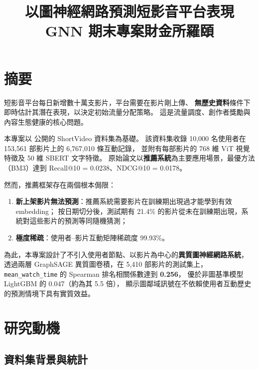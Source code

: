 \documentclass[12pt, a4paper]{article}
\title{%
  \vspace{-1.8cm}
  {\LARGE\bfseries 以圖神經網路預測短影音平台表現}\\[0em]
  {\normalsize GNN 期末專案\quad\textperiodcentered\quad 財金所\;羅頤}%
}
\author{}
\date{}
\begin{document}
\maketitle\thispagestyle{fancy}
\vspace{-2cm}

\section{摘要}
\label{sec:abstract}

短影音平台每日新增數十萬支影片，平台需要在影片剛上傳、
\textbf{無歷史資料}條件下即時估計其潛在表現，以決定初始流量分配策略。
這是流量調度、創作者獎勵與內容生態健康的核心問題。

本專案以 \citet{shang2025shortvideo} 公開的 ShortVideo 資料集為基礎。
該資料集收錄 10,000 名使用者在 153,561 部影片上的 6,767,010 條互動記錄，
並附有每部影片的 768 維 ViT 視覺特徵及 50 維 SBERT 文字特徵。
原始論文以\textbf{推薦系統}為主要應用場景，最優方法（BM3）達到
Recall@10 = 0.0238、NDCG@10 = 0.0178。

然而，推薦框架存在兩個根本侷限：
\begin{enumerate}[leftmargin=*]
\item \textbf{新上架影片無法預測}：推薦系統需要影片在訓練期出現過才能學到有效 embedding；
      按日期切分後，測試期有 21.4\% 的影片從未在訓練期出現，系統對這些影片的預測等同隨機猜測；
\item \textbf{極度稀疏}：使用者–影片互動矩陣稀疏度 99.93\%。
\end{enumerate}

\begin{sloppypar}
為此，本專案設計了不引入使用者節點、以影片為中心的\textbf{異質圖神經網路系統}，
透過兩層 GraphSAGE 異質圖卷積，在 5,410 部影片的測試集上，
\texttt{mean\_watch\_time} 的 Spearman 排名相關係數達到 \textbf{0.256}，
優於非圖基準模型 LightGBM 的 0.047（約為其 5.5 倍），
顯示圖鄰域訊號在不依賴使用者互動歷史的預測情境下具有實質效益。
\end{sloppypar}

\section{研究動機}
\label{sec:motivation}

\subsection{資料集背景與統計}
\end{document}
